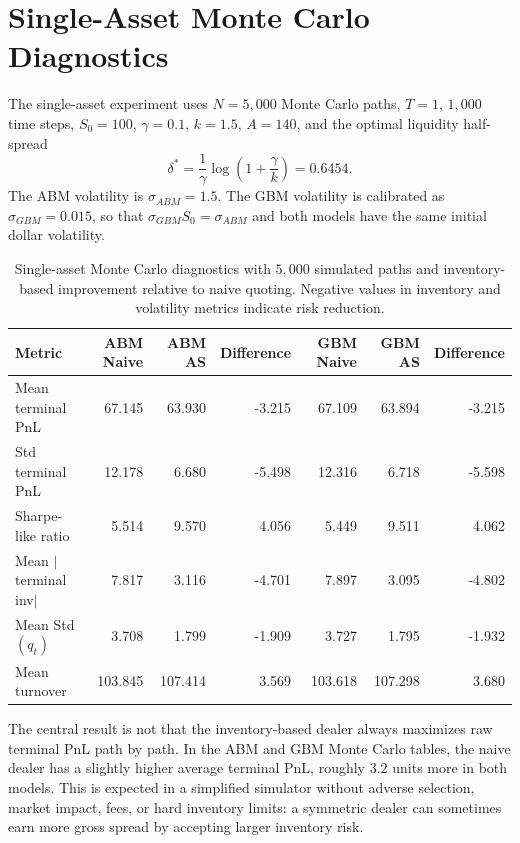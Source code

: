 \documentclass[a4paper,10pt,titlepage,oneside,openany]{book}
\theoremstyle{plain}\newtheorem{theorem}{Theorem}[chapter]
\theoremstyle{definition}\newtheorem{definition}{Definition}[chapter]
\theoremstyle{remark}\newtheorem{remark}{Remark}[chapter]
\begin{document}
\section{Single-Asset Monte Carlo Diagnostics}

The single-asset experiment uses $N=5{,}000$ Monte Carlo paths, $T=1$, $1{,}000$ time steps, $S_0=100$, $\gamma=0.1$, $k=1.5$, $A=140$, and the optimal liquidity half-spread
\[
\delta^*=
\frac{1}{\gamma}\log\!\left(1+\frac{\gamma}{k}\right)
=
0.6454.
\]
The ABM volatility is $\sigma_{ABM}=1.5$. The GBM volatility is calibrated as $\sigma_{GBM}=0.015$, so that $\sigma_{GBM}S_0=\sigma_{ABM}$ and both models have the same initial dollar volatility.

\begin{table}[H]
\centering
\small
\caption{Single-asset Monte Carlo diagnostics with $5{,}000$ simulated paths and inventory-based improvement relative to naive quoting. Negative values in inventory and volatility metrics indicate risk reduction.}
\begin{tabular*}{\textwidth}{@{\extracolsep{\fill}}l!{\vrule width 0.5pt}rrr!{\vrule width 0.5pt}rrr@{}}
\toprule
Metric & ABM Naive & ABM AS & Difference & GBM Naive & GBM AS & Difference \\
\midrule
Mean terminal PnL        & 67.145 & 63.930 & -3.215 & 67.109 & 63.894 & -3.215 \\
Std terminal PnL         & 12.178 &  6.680 & -5.498 & 12.316 &  6.718 & -5.598 \\
Sharpe-like ratio        &  5.514 &  9.570 &  4.056 &  5.449 &  9.511 &  4.062 \\
Mean $|$terminal inv$|$  &  7.817 &  3.116 & -4.701 &  7.897 &  3.095 & -4.802 \\
Mean Std$(q_t)$          &  3.708 &  1.799 & -1.909 &  3.727 &  1.795 & -1.932 \\
Mean turnover            &103.845 &107.414 &  3.569 &103.618 &107.298 &  3.680 \\
\bottomrule
\end{tabular*}
\end{table}

The central result is not that the inventory-based dealer always maximizes raw terminal PnL path by path. In the ABM and GBM Monte Carlo tables, the naive dealer has a slightly higher average terminal PnL, roughly $3.2$ units more in both models. This is expected in a simplified simulator without adverse selection, market impact, fees, or hard inventory limits: a symmetric dealer can sometimes earn more gross spread by accepting larger inventory risk.
\end{document}
